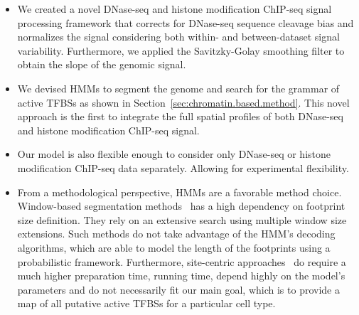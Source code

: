 \begin{itemize}
\item We created a novel DNase-seq and histone modification ChIP-seq signal processing framework that corrects for DNase-seq sequence cleavage bias and normalizes the signal considering both within- and between-dataset signal variability. Furthermore, we applied the Savitzky-Golay smoothing filter to obtain the slope of the genomic signal.
\item We devised HMMs to segment the genome and search for the grammar of active TFBSs as shown in Section~\ref{sec:chromatin.based.method}. This novel approach is the first to integrate the full spatial profiles of both DNase-seq and histone modification ChIP-seq signal.
\item Our model is also flexible enough to consider only DNase-seq or histone modification ChIP-seq data separately. Allowing for experimental flexibility.
\item From a methodological perspective, HMMs are a favorable method choice. Window-based segmentation methods~\citep{hesselberth2009,neph2012a,piper2013} has a high dependency on footprint size definition. They rely on an extensive search using multiple window size extensions. Such methods do not take advantage of the HMM's decoding algorithms, which are able to model the length of the footprints using a probabilistic framework. Furthermore, site-centric approaches~\citep{pique2011,cuellar2012,sherwood2014,yardimci2014} do require a much higher preparation time, running time, depend highly on the model's parameters and do not necessarily fit our main goal, which is to provide a map of all putative active TFBSs for a particular cell type.
\end{itemize}


